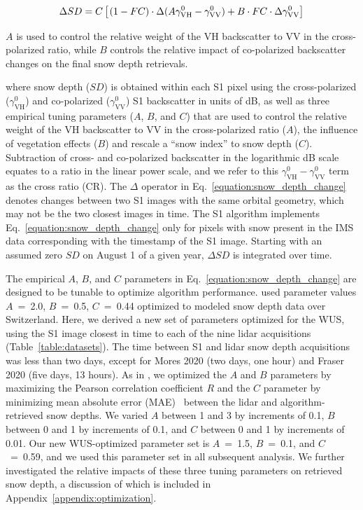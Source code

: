 \documentclass[journal abbreviation, manuscript]{copernicus}
\begin{document}
\begin{equation}\label{equation:snow_depth_change}
    \Delta SD = C \left[ \hspace{1 pt} (1 - FC) \cdot \Delta ( A \gamma^0_{\mathrm{VH}} - \gamma^0_{\mathrm{VV}} ) + B \cdot FC \cdot \Delta \gamma^0_{\mathrm{VV}} \right] 
\end{equation}

$A$ is used to control the relative weight of the VH backscatter to VV in the cross-polarized ratio, while $B$ controls the relative impact of co-polarized backscatter changes on the final snow depth retrievals.

where snow depth ($SD$) is obtained within each S1 pixel using the cross-polarized ($\gamma^0_{\mathrm{VH}}$) and co-polarized ($\gamma^0_{\mathrm{VV}}$) S1 backscatter in units of dB, as well as three empirical tuning parameters ($A$, $B$, and $C$) that are used to control the relative weight of the VH backscatter to VV in the cross-polarized ratio ($A$), the influence of vegetation effects ($B$) and rescale a ``snow index'' to snow depth ($C$). Subtraction of cross- and co-polarized backscatter in the logarithmic dB scale equates to a ratio in the linear power scale, and we refer to this $\gamma^0_{\mathrm{VH}} - \gamma^0_{\mathrm{VV}}$ term as the cross ratio (CR). The $\Delta$ operator in Eq.~\ref{equation:snow_depth_change} denotes changes between two S1 images with the same orbital geometry, which may not be the two closest images in time. The S1 algorithm implements Eq.~\ref{equation:snow_depth_change} only for pixels with snow present in the IMS data corresponding with the timestamp of the S1 image. Starting with an assumed zero $SD$ on August 1 of a given year, $\Delta SD$ is integrated over time. 

The empirical $A$, $B$, and $C$ parameters in Eq.~\ref{equation:snow_depth_change} are designed to be tunable to optimize algorithm performance. \citet{Lievens.2022} used parameter values $A$~=~2.0, $B$~=~0.5, $C$~=~0.44 optimized to modeled snow depth data over Switzerland. Here, we derived a new set of parameters optimized for the WUS, using the S1 image closest in time to each of the nine lidar acquisitions (Table~\ref{table:datasets}). The time between S1 and lidar snow depth acquisitions was less than two days, except for Mores 2020 (two days, one hour) and Fraser 2020 (five days, 13 hours). As in \citet{Lievens.2022}, we optimized the $A$ and $B$ parameters by maximizing the Pearson correlation coefficient $R$ and the $C$ parameter by minimizing mean absolute error (MAE)~\citep{Webster.2007} between the lidar and algorithm-retrieved snow depths. We varied $A$ between 1 and 3 by increments of 0.1, $B$ between 0 and 1 by increments of 0.1, and $C$ between 0 and 1 by increments of 0.01. Our new WUS-optimized parameter set is $A$~=~1.5, $B$~=~0.1, and $C$~=~0.59, and we used this parameter set in all subsequent analysis. We further investigated the relative impacts of these three tuning parameters on retrieved snow depth, a discussion of which is included in Appendix~\ref{appendix:optimization}.
\end{document}
